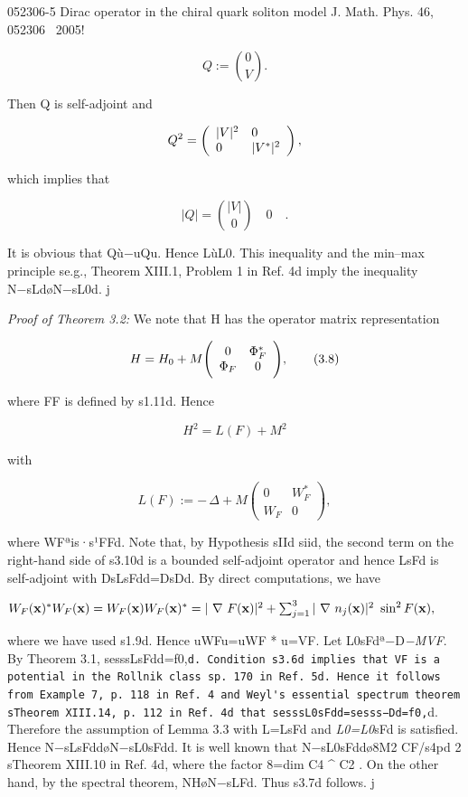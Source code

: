 \documentclass{article}
\begin{document}
052306-5 Dirac operator in the chiral quark soliton model J. Math. Phys. 46, 052306 ~2005!

$$Q{\mathrm{:=}}{\binom{0}{V}}.$$

Then Q is self-adjoint and

$$Q^{2}=\left(\begin{array}{l l}{{|V|^{2}}}&{{0}}\\ {{0}}&{{|V^{*}|^{2}}}\end{array}\right),$$

which implies that

$$|Q|={\binom{|V|}{0}}\quad0\quad.$$

It is obvious that Qù−uQu. Hence LùL0. This inequality and the min–max principle se.g., Theorem XIII.1, Problem 1 in Ref. 4d imply the inequality N−sLdøN−sL0d. j

\textit{Proof of Theorem 3.2:} We note that H has the operator matrix representation

$$H=H_{0}+M\Biggl{(}\begin{array}{cc}0&\Phi_{F}^{*}\\ \Phi_{F}&0\end{array}\Biggr{)},\tag{3.8}$$

where FF is defined by s1.11d. Hence

$$H^{2}=L(F)+M^{2}\tag{3.9}$$

with

$$L(F):=-\,\Delta+M\!\left(\begin{array}{cc}0&W_{F}^{*}\\ W_{F}&0\end{array}\right),\tag{3.10}$$

where WFªis·s¹FFd. Note that, by Hypothesis sIId siid, the second term on the right-hand side of s3.10d is a bounded self-adjoint operator and hence LsFd is self-adjoint with DsLsFdd=DsDd. By direct computations, we have

$W_{F}({\bf x})^{*}W_{F}({\bf x})=W_{F}({\bf x})W_{F}({\bf x})^{*}=|\ \nabla\ F({\bf x})|^{2}+\sum_{j=1}^{3}|\ \nabla\ n_{j}({\bf x})|^{2}\ \sin^{2}F({\bf x}),$

where we have used s1.9d. Hence uWFu=uWF * u=VF. Let L0sFdª−D\textit{−MVF}. By Theorem 3.1, sesssLsFdd=f0,\verb|d. Condition s3.6d implies that VF is a potential in the Rollnik class sp. 170 in Ref. 5d. Hence it follows from Example 7, p. 118 in Ref. 4 and Weyl's essential spectrum theorem sTheorem XIII.14, p. 112 in Ref. 4d that sesssL0sFdd=sesss−Dd=f0,|d. Therefore the assumption of Lemma 3.3 with L=LsFd and \textit{L0=L0}sFd is satisfied. Hence N−sLsFddøN−sL0sFdd. It is well known that N−sL0sFddø8M2 CF/s4pd 2 sTheorem XIII.10 in Ref. 4d, where the factor 8=dim C4 ^ C2 . On the other hand, by the spectral theorem, NHøN−sLFd. Thus s3.7d follows. j
\end{document}
